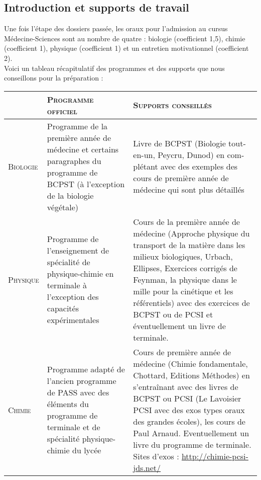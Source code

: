 \subsection{Introduction et supports de travail}

Une fois l’étape des dossiers passée, les oraux pour l’admission au cursus Médecine-Sciences sont au nombre de quatre : biologie (coefficient 1,5), chimie (coefficient 1), physique (coefficient 1) et un entretien motivationnel (coefficient 2).\\

Voici un tableau récapitulatif des programmes et des supports que nous conseillons pour la préparation :\\

\begin{tabularx}{15cm}{|X||m{6cm}|m{6cm}|}
\hline
&\textsc{Programme officiel}&\textsc{Supports conseillés}\\\hline\hline

\textsc{Biologie}&Programme de la première année de médecine et certains paragraphes du programme de BCPST (à l’exception de la biologie végétale)&Livre de BCPST (Biologie tout-en-un, Peycru, Dunod) en com- plétant avec des exemples des cours de première année de médecine qui sont plus détaillés\\\hline

\textsc{Physique}&Programme de l’enseignement de spécialité de physique-chimie en terminale à l’exception des capacités expérimentales&Cours de la première année de médecine (Approche physique du transport de la matière dans les milieux biologiques, Urbach, Ellipses, Exercices corrigés de Feynman, la physique dans le mille pour la cinétique et les référentiels) avec des exercices de BCPST ou de PCSI et éventuellement un livre de terminale.\\\hline

\textsc{Chimie}&Programme adapté de l’ancien programme de PASS avec des éléments du programme de terminale et de spécialité physique-chimie du lycée&Cours de première année de médecine (Chimie fondamentale, Chottard, Editions Méthodes) en s’entraînant avec des livres de BCPST ou PCSI (Le Lavoisier PCSI avec des exos types oraux des grandes écoles), les cours de Paul Arnaud. Eventuellement un livre du programme de terminale. Sites d’exos : \href{http://chimie-pcsi-jds.net/}{http://chimie-pcsi-jds.net/}\\\hline
\end{tabularx}

\newpage